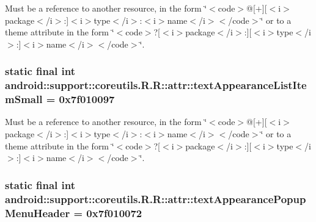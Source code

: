 Must be a reference to another resource, in the form \char`\"{}$<$code$>$@\mbox{[}+\mbox{]}\mbox{[}$<$i$>$package$<$/i$>$:\mbox{]}$<$i$>$type$<$/i$>$:$<$i$>$name$<$/i$>$$<$/code$>$\char`\"{} or to a theme attribute in the form \char`\"{}$<$code$>$?\mbox{[}$<$i$>$package$<$/i$>$:\mbox{]}\mbox{[}$<$i$>$type$<$/i$>$:\mbox{]}$<$i$>$name$<$/i$>$$<$/code$>$\char`\"{}. \hypertarget{classandroid_1_1support_1_1coreutils_1_1_r_1_1attr_13828f83a04e4eef190a9d7f09523194}{
\subsubsection[{textAppearanceListItemSmall}]{\setlength{\rightskip}{0pt plus 5cm}static final int android::support::coreutils.R.R::attr::textAppearanceListItemSmall = 0x7f010097}}
\label{classandroid_1_1support_1_1coreutils_1_1_r_1_1attr_13828f83a04e4eef190a9d7f09523194}


Must be a reference to another resource, in the form \char`\"{}$<$code$>$@\mbox{[}+\mbox{]}\mbox{[}$<$i$>$package$<$/i$>$:\mbox{]}$<$i$>$type$<$/i$>$:$<$i$>$name$<$/i$>$$<$/code$>$\char`\"{} or to a theme attribute in the form \char`\"{}$<$code$>$?\mbox{[}$<$i$>$package$<$/i$>$:\mbox{]}\mbox{[}$<$i$>$type$<$/i$>$:\mbox{]}$<$i$>$name$<$/i$>$$<$/code$>$\char`\"{}. \hypertarget{classandroid_1_1support_1_1coreutils_1_1_r_1_1attr_453dfd9c527becd2d4d5d71c92fd1997}{
\subsubsection[{textAppearancePopupMenuHeader}]{\setlength{\rightskip}{0pt plus 5cm}static final int android::support::coreutils.R.R::attr::textAppearancePopupMenuHeader = 0x7f010072}}
\label{classandroid_1_1support_1_1coreutils_1_1_r_1_1attr_453dfd9c527becd2d4d5d71c92fd1997}


